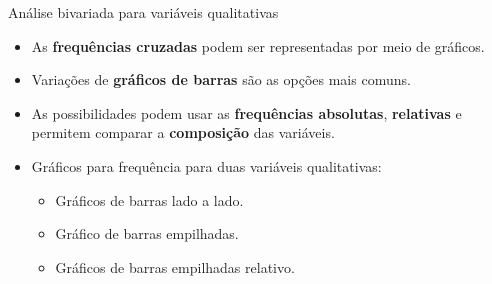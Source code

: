 \documentclass[
  ignorenonframetext,
  serif,
  professionalfont,
  usenames,
  dvipsnames,
  aspectratio = 169]{beamer}
\providecommand{\tightlist}{%
  \setlength{\itemsep}{0pt}\setlength{\parskip}{0pt}}
\renewcommand{\tightlist}{%
  \setlength{\itemsep}{0\baselineskip}
  \setlength{\parskip}{0.25\baselineskip}
}
\def\beginAHalfColumn{\begin{minipage}{0.49\textwidth}}%
\def\endColumns{\end{minipage}}%
\begin{document}
\begin{frame}{Análise bivariada para variáveis qualitativas}
\label{anuxe1lise-bivariada-para-variuxe1veis-qualitativas-2}
\beginAHalfColumn

\begin{itemize}
\tightlist
\item
  As \textbf{frequências cruzadas} podem ser representadas por meio de
  gráficos.
\end{itemize}

\vspace{0.3cm}

\begin{itemize}
\tightlist
\item
  Variações de \textbf{gráficos de barras} são as opções mais comuns.
\end{itemize}

\vspace{0.3cm}

\begin{itemize}
\tightlist
\item
  As possibilidades podem usar as \textbf{frequências absolutas},
  \textbf{relativas} e permitem comparar a \textbf{composição} das
  variáveis.
\end{itemize}

\endColumns
\beginAHalfColumn

\begin{itemize}
\tightlist
\item
  Gráficos para frequência para duas variáveis qualitativas:

  \begin{itemize}
  \tightlist
  \item
    Gráficos de barras lado a lado.
  \item
    Gráfico de barras empilhadas.
  \item
    Gráficos de barras empilhadas relativo.
  \end{itemize}
\end{itemize}

\endColumns
\end{frame}
\end{document}
